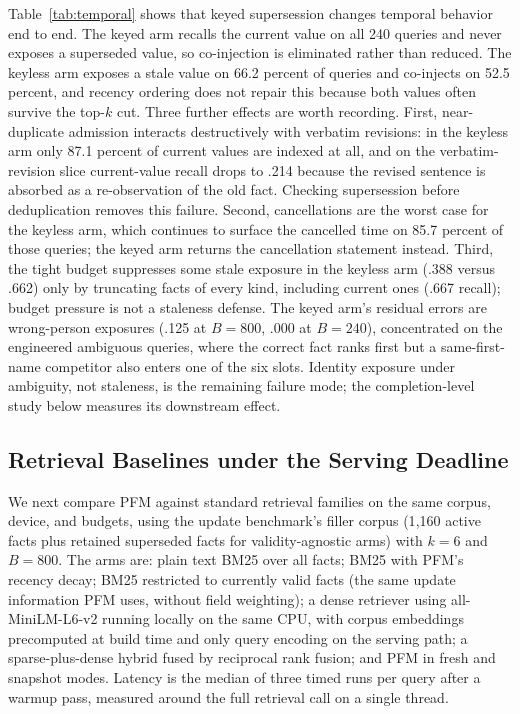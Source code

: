 \documentclass[letterpaper]{article} %
\begin{document}
Table~\ref{tab:temporal} shows that keyed supersession changes temporal behavior end to end. The keyed arm recalls the current value on all 240 queries and never exposes a superseded value, so co-injection is eliminated rather than reduced. The keyless arm exposes a stale value on 66.2 percent of queries and co-injects on 52.5 percent, and recency ordering does not repair this because both values often survive the top-$k$ cut. Three further effects are worth recording. First, near-duplicate admission interacts destructively with verbatim revisions: in the keyless arm only 87.1 percent of current values are indexed at all, and on the verbatim-revision slice current-value recall drops to .214 because the revised sentence is absorbed as a re-observation of the old fact. Checking supersession before deduplication removes this failure. Second, cancellations are the worst case for the keyless arm, which continues to surface the cancelled time on 85.7 percent of those queries; the keyed arm returns the cancellation statement instead. Third, the tight budget suppresses some stale exposure in the keyless arm (.388 versus .662) only by truncating facts of every kind, including current ones (.667 recall); budget pressure is not a staleness defense. The keyed arm's residual errors are wrong-person exposures (.125 at $B{=}800$, .000 at $B{=}240$), concentrated on the engineered ambiguous queries, where the correct fact ranks first but a same-first-name competitor also enters one of the six slots. Identity exposure under ambiguity, not staleness, is the remaining failure mode; the completion-level study below measures its downstream effect.

\subsection{Retrieval Baselines under the Serving Deadline}

We next compare PFM against standard retrieval families on the same corpus, device, and budgets, using the update benchmark's filler corpus (1{,}160 active facts plus retained superseded facts for validity-agnostic arms) with $k{=}6$ and $B{=}800$. The arms are: plain text BM25 over all facts; BM25 with PFM's recency decay; BM25 restricted to currently valid facts (the same update information PFM uses, without field weighting); a dense retriever using all-MiniLM-L6-v2 running locally on the same CPU, with corpus embeddings precomputed at build time and only query encoding on the serving path; a sparse-plus-dense hybrid fused by reciprocal rank fusion; and PFM in fresh and snapshot modes. Latency is the median of three timed runs per query after a warmup pass, measured around the full retrieval call on a single thread.
\end{document}
